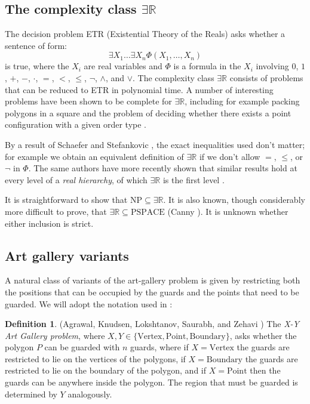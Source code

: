 \documentclass[11pt]{article}
\newcommand{\rr}{\mathbb R}
\newcommand{\txt}[1]{\text{#1}}
\theoremstyle{plain}
\theoremstyle{definition}
\newtheorem{definition}[theorem]{Definition}
\numberwithin{theorem}{section}
\begin{document}
\subsection{The complexity class $\exists\rr$}

The decision problem ETR (Existential Theory of the Reals) asks whether a sentence of form:
\[\exists X_1\dots\exists X_n \Phi(X_1,\dots,X_n)\]
is true, where the $X_i$ are real variables and $\Phi$ is a formula in the $X_i$ involving $0$, $1$, $+$, $-$, $\cdot$, $=$, $<$, $\le$, $\neg$, $\wedge$, and $\vee$. The complexity class $\exists\rr$ consists of problems that can be reduced to ETR in polynomial time. A number of interesting problems have been shown to be complete for $\exists\rr$, including for example packing polygons in a square \cite{PackingProblem} and the problem of deciding whether there exists a point configuration with a given order type \cite{Mnev, Stretchability}.

By a result of Schaefer and Stefankovic \cite{ETRRobustness}, the exact inequalities used don't matter; for example we obtain an equivalent definition of $\exists\rr$ if we don't allow $=$, $\le$, or $\neg$ in $\Phi$. The same authors have more recently shown that similar results hold at every level of a \emph{real hierarchy}, of which $\exists\rr$ is the first level \cite{RealHeirarchy}.

It is straightforward to show that $\txt{NP}\subseteq\exists\rr$. It is also known, though considerably more difficult to prove, that $\exists\rr\subseteq \txt{PSPACE}$ (Canny \cite{SubsetPSPACE}). It is unknown whether either inclusion is strict. 

\subsection{Art gallery variants}

A natural class of variants of the art-gallery problem is given by restricting both the positions that can be occupied by the guards and the points that need to be guarded. We will adopt the notation used in \cite{AlmostConvex}:

\begin{definition}
(Agrawal, Knudsen, Lokshtanov, Saurabh, and Zehavi \cite{AlmostConvex}) The \emph{X-Y Art Gallery problem}, where $X, Y\in \{\text{Vertex}, \text{Point}, \text{Boundary}\}$, asks whether the polygon $P$ can be guarded with $n$ guards, where if $X=\text{Vertex}$ the guards are restricted to lie on the vertices of the polygons, if $X=\text{Boundary}$ the guards are restricted to lie on the boundary of the polygon, and if $X=\text{Point}$ then the guards can be anywhere inside the polygon. The region that must be guarded is determined by $Y$ analogously.
\end{definition}
\end{document}
